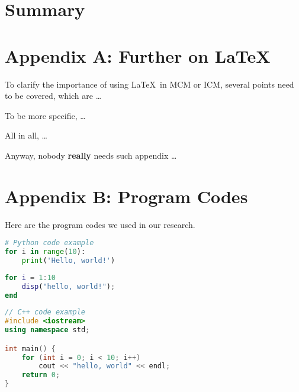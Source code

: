 \documentclass[12pt]{article}  %
\begin{document}
\section{Summary}


\clearpage



\begin{subappendices}  %

\section{Appendix A: Further on \LaTeX}
To clarify the importance of using \LaTeX\ in MCM or ICM, several points need to be covered, which are \ldots

To be more specific, \ldots

All in all, \ldots

Anyway, nobody \textbf{really} needs such appendix \ldots

\section{Appendix B: Program Codes}
Here are the program codes we used in our research.


\begin{lstlisting}[language=Python, name={test.py}]
# Python code example
for i in range(10):
    print('Hello, world!')
\end{lstlisting}

\begin{lstlisting}[language=MATLAB, name={test.m}]
% MATLAB code example
for i = 1:10
    disp("hello, world!");
end
\end{lstlisting}

\begin{lstlisting}[language=C++, name={test.cpp}]
// C++ code example
#include <iostream>
using namespace std;

int main() {
    for (int i = 0; i < 10; i++)
        cout << "hello, world" << endl;
    return 0;
}
\end{lstlisting}

\end{subappendices}  %
\end{document}
